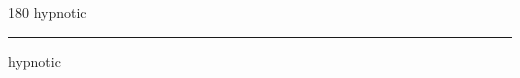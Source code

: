
\begin{frame}
\begin{center}
\begin{turn}{180}
{\fontsize{2.5cm}{1em}\selectfont hypnotic}
\end{turn}
\vspace{1em}\par  
\hrule
\vspace{1em}\par  
{\fontsize{2.5cm}{1em}\selectfont hypnotic}
\end{center}
\end{frame}
